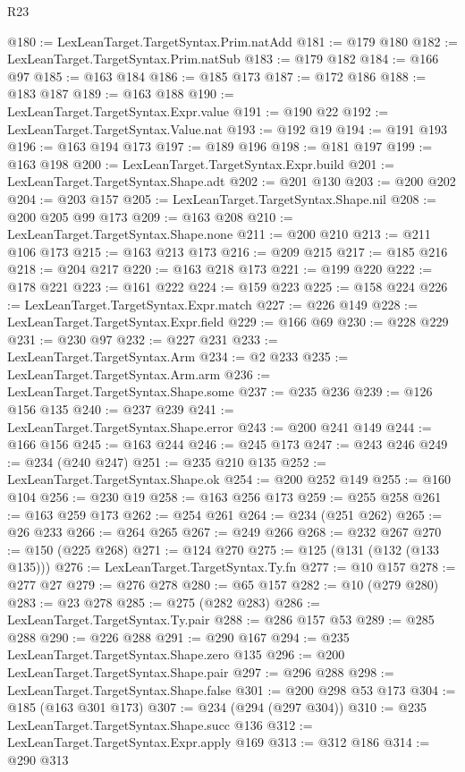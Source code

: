 \begin{lexlean}{R23}
\begin{coremodule}
@180 := LexLeanTarget.TargetSyntax.Prim.natAdd
@181 := @179 @180
@182 := LexLeanTarget.TargetSyntax.Prim.natSub
@183 := @179 @182
@184 := @166 @97
@185 := @163 @184
@186 := @185 @173
@187 := @172 @186
@188 := @183 @187
@189 := @163 @188
@190 := LexLeanTarget.TargetSyntax.Expr.value
@191 := @190 @22
@192 := LexLeanTarget.TargetSyntax.Value.nat
@193 := @192 @19
@194 := @191 @193
@196 := @163 @194 @173
@197 := @189 @196
@198 := @181 @197
@199 := @163 @198
@200 := LexLeanTarget.TargetSyntax.Expr.build
@201 := LexLeanTarget.TargetSyntax.Shape.adt
@202 := @201 @130
@203 := @200 @202
@204 := @203 @157
@205 := LexLeanTarget.TargetSyntax.Shape.nil
@208 := @200 @205 @99 @173
@209 := @163 @208
@210 := LexLeanTarget.TargetSyntax.Shape.none
@211 := @200 @210
@213 := @211 @106 @173
@215 := @163 @213 @173
@216 := @209 @215
@217 := @185 @216
@218 := @204 @217
@220 := @163 @218 @173
@221 := @199 @220
@222 := @178 @221
@223 := @161 @222
@224 := @159 @223
@225 := @158 @224
@226 := LexLeanTarget.TargetSyntax.Expr.match
@227 := @226 @149
@228 := LexLeanTarget.TargetSyntax.Expr.field
@229 := @166 @69
@230 := @228 @229
@231 := @230 @97
@232 := @227 @231
@233 := LexLeanTarget.TargetSyntax.Arm
@234 := @2 @233
@235 := LexLeanTarget.TargetSyntax.Arm.arm
@236 := LexLeanTarget.TargetSyntax.Shape.some
@237 := @235 @236
@239 := @126 @156 @135
@240 := @237 @239
@241 := LexLeanTarget.TargetSyntax.Shape.error
@243 := @200 @241 @149
@244 := @166 @156
@245 := @163 @244
@246 := @245 @173
@247 := @243 @246
@249 := @234 (@240 @247)
@251 := @235 @210 @135
@252 := LexLeanTarget.TargetSyntax.Shape.ok
@254 := @200 @252 @149
@255 := @160 @104
@256 := @230 @19
@258 := @163 @256 @173
@259 := @255 @258
@261 := @163 @259 @173
@262 := @254 @261
@264 := @234 (@251 @262)
@265 := @26 @233
@266 := @264 @265
@267 := @249 @266
@268 := @232 @267
@270 := @150 (@225 @268)
@271 := @124 @270
@275 := @125 (@131 (@132 (@133 @135)))
@276 := LexLeanTarget.TargetSyntax.Ty.fn
@277 := @10 @157
@278 := @277 @27
@279 := @276 @278
@280 := @65 @157
@282 := @10 (@279 @280)
@283 := @23 @278
@285 := @275 (@282 @283)
@286 := LexLeanTarget.TargetSyntax.Ty.pair
@288 := @286 @157 @53
@289 := @285 @288
@290 := @226 @288
@291 := @290 @167
@294 := @235 LexLeanTarget.TargetSyntax.Shape.zero @135
@296 := @200 LexLeanTarget.TargetSyntax.Shape.pair
@297 := @296 @288
@298 := LexLeanTarget.TargetSyntax.Shape.false
@301 := @200 @298 @53 @173
@304 := @185 (@163 @301 @173)
@307 := @234 (@294 (@297 @304))
@310 := @235 LexLeanTarget.TargetSyntax.Shape.succ @136
@312 := LexLeanTarget.TargetSyntax.Expr.apply @169
@313 := @312 @186
@314 := @290 @313

\end{coremodule}
\end{lexlean}
